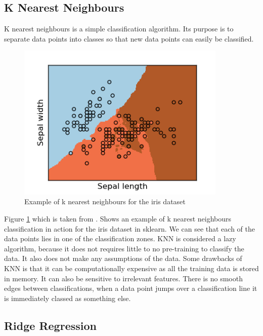 \subsection{K Nearest Neighbours}

K nearest neighbours is a simple classification algorithm. Its purpose is to separate data points into classes so that new data points can easily be classified.
\begin{figure}[H]
  \centering
  \includegraphics[scale=0.5,width=100mm]{./images/k-nearest-neighbours-example.png}
  \caption{Example of k nearest neighbours for the iris dataset}
  \label{fig:k-nearest-neighbours-example}
\end{figure}
Figure \ref{fig:k-nearest-neighbours-example} which is taken from \cite{kNearestNeighboursExample}. Shows an example of k nearest neighbours classification in action for the iris dataset in sklearn. We can see that each of the data points lies in one of the classification zones. KNN is considered a lazy algorithm, because it does not requires little to no pre-training to classify the data. It also does not make any assumptions of the data. Some drawbacks of KNN is that it can be computationally expensive as all the training data is stored in memory. It can also be sensitive to irrelevant features. There is no smooth edges between classifications, when a data point jumps over a classification line it is immediately classed as something else.

\subsection{Ridge Regression}


